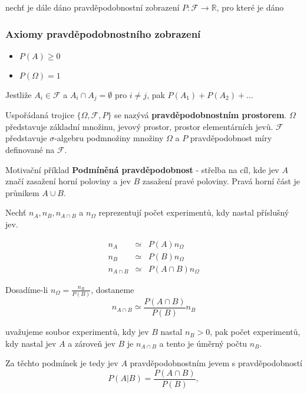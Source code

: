 		nechť je dále dáno pravděpodobnostní zobrazení $P: \mathscr{F}\to\mathbb{R}$, pro které je dáno
	\subsubsection*{Axiomy pravděpodobnostního zobrazení}
		\begin{itemize}[noitemsep]
			\item $P(A)\geq 0$
			\item $P(\Omega)=1$
		\end{itemize}
		
		Jestliže $A_i\in\mathscr{F}$ a $A_i\cap A_j=\emptyset$ pro $i\neq j$, pak $P(A_1)+P(A_2)+\ldots$\br
		
		Uspořádaná trojice $\{\Omega,\mathscr{F},P\}$ se nazývá \textbf{pravděpodobnostním prostorem}. $\Omega$ představuje základní množinu, jevový prostor, prostor elementárních jevů. $\mathscr{F}$ představuje $\sigma$-algebru podmnožiny množiny $\Omega$ a $P$ pravděpodobnost míry definované na $\mathscr{F}$.
		
		\begin{note}{Motivační příklad}
		\textbf{Podmíněná pravděpodobnost} - střelba na cíl, kde jev $A$ značí zasažení horní poloviny a jev $B$ zasažení pravé poloviny. Pravá horní část je průnikem $A\cup B$.\br
		
		\begin{figure}
			
		\end{figure}
		\end{note}
	
		Nechť $n_A,n_B, n_{A\cap B}$ a $n_\Omega$ reprezentují počet experimentů, kdy nastal příslušný jev.
		
		\begin{eqnarray*}
			n_A & \simeq & P(A)n_\Omega\\
			n_B & \simeq & P(B)n_\Omega\\
			n_{A\cap B} & \simeq & P(A\cap B)n_\Omega
		\end{eqnarray*}
		
		Dosadíme-li $n_\Omega=\frac{n_B}{P(B)}$, dostaneme
		\[ n_{A\cap B} \simeq \frac{P(A\cap B)}{P(B)}n_B \]
		
		uvažujeme soubor experimentů, kdy jev $B$ nastal $n_B>0$, pak počet experimentů, kdy nastal jev $A$ a zároveň jev $B$ je $n_{A\cap B}$ a tento je úměrný počtu $n_B$.\br
		
		Za těchto podmínek je tedy jev $A$ pravděpodobnostním jevem s pravděpodobností 
		\[ P(A|B) = \frac{P(A\cap B)}{P(B)}, \]
		
